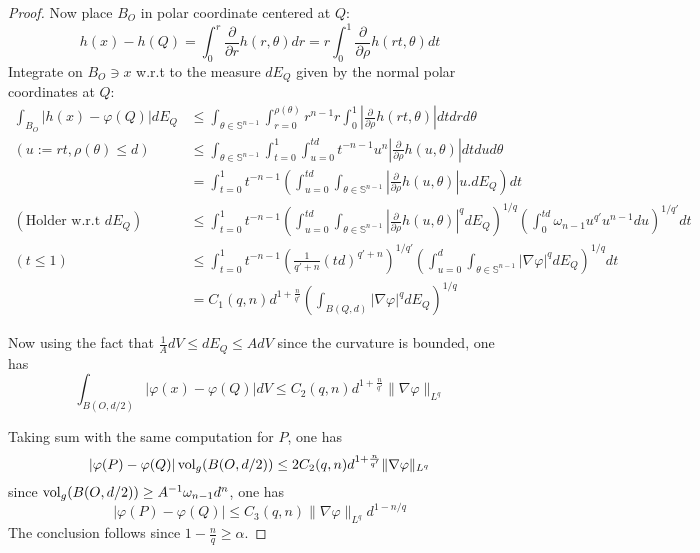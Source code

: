 \begin{proof}
Now place \(B_O\) in polar coordinate centered at \(Q\):
\[
 h(x) - h(Q) = \int_0^r \frac{\partial}{\partial r}h(r,\theta) dr = r\int_0^1
\frac{\partial}{\partial \rho}h(rt,\theta) dt
\]
Integrate on \(B_O\ni x\) w.r.t to the measure \(dE_Q\) given by the normal polar
coordinates at \(Q\):
\begin{equation}
\label{eq:lem:sobolev-case-holder}
\begin{split}
\int_{B_O} |h(x) - \varphi(Q)| dE_Q &\leq \int_{\theta\in \mathbb{S}^{n-1}} \int_{r=0}^{\rho(\theta)} r^{n-1}r \int_0^1|\frac{\partial}{\partial \rho}h(rt,\theta)|dtdrd\theta \\
( u:= rt, \rho(\theta)\leq d)\qquad &\leq \int_{\theta\in \mathbb{S}^{n-1}}\int_{t=0}^1\int_{u=0}^{td}t^{-n-1}u^n \left|\frac{\partial}{\partial \rho}h(u,\theta)\right|dtdud\theta\\
      	  		   &= \int_{t=0}^1 t^{-n-1}\left( \int_{u=0}^{td}\int_{\theta\in \mathbb{S}^{n-1}}\left| \frac{\partial}{\partial \rho}h(u,\theta) \right|u. dE_Q  \right)dt \\
(\text{Holder w.r.t } dE_Q)\qquad &\leq \int_{t=0}^1  t^{-n-1} \left( \int_{u=0}^{td} \int_{\theta\in \mathbb{S}^{n-1}} \left| \frac{\partial}{\partial \rho}h(u,\theta) \right|^q dE_Q \right)^{1/q} \left( \int_0^{td}\omega_{n-1} u^{q'}u^{n-1} du \right)^{1/q'}dt\\
(t\leq 1)\qquad	      &\leq\int_{t=0}^{1} t^{-n-1} \left(\frac{1}{q'+n}(td)^{q'+n}\right)^{1/q'} \left( \int_{u=0}^d\int_{\theta\in \mathbb{S}^{n-1}} |\nabla\varphi|^q dE_Q   \right)^{1/q}dt\\
       &= C_1(q,n)d^{1 + \frac{n}{q'}} \left(\int_{B(Q,d)}|\nabla\varphi|^q dE_Q   \right)^{1/q}
\end{split}   
\end{equation}

Now using the fact that \(\frac{1}{A} dV \leq dE_Q\leq A dV\) since the curvature is bounded, one
has
\[
 \int_{B(O,d/2)}|\varphi(x) -\varphi(Q)|dV \leq C_2(q,n)d^{1 + \frac{n}{q'}} \| \nabla\varphi\|_{L^q}
\]

Taking sum with the same computation for \(P\), one has
\[
\left| \varphi(P)-\varphi(Q)\right|\mathop{\rm vol}\nolimits_g(B(O,d/2)) \leq 2C_2(q,n) d^{1 + \frac{n}{q'}}  \| \nabla\varphi\|_{L^q}
\]
since \(\mathop{\rm vol}\nolimits_g(B(O,d/2)) \geq A^{-1}\omega_{n-1}d^n\), one has
\[
 \left| \varphi(P)-\varphi(Q)\right| \leq C_3(q,n) \|\nabla\varphi\|_{L^q} d^{1-n/q}
\]
The conclusion follows since \(1-\frac{n}{q}\geq \alpha\).
\end{proof}

